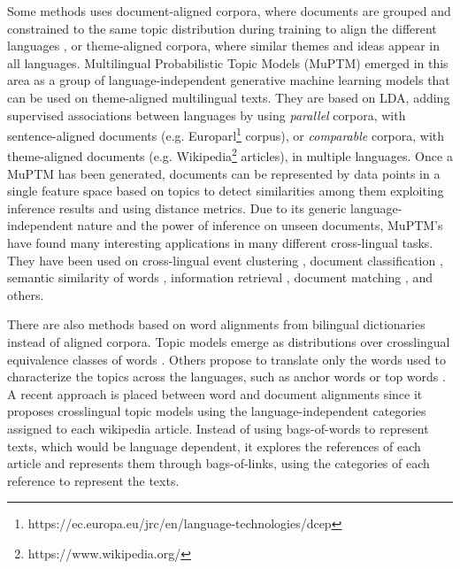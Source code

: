 Some methods uses document-aligned corpora, where documents are grouped and constrained to the same topic distribution during training to align the different languages \citep{Smet2009, mimno-etal-2009-polylingual, Ni2009, Fukumasu2012, Zhang2013}, or theme-aligned corpora, where similar themes and ideas appear in all languages\citep{Graber2009}. Multilingual Probabilistic Topic Models (MuPTM) \citep{Vulic2015} emerged in this area as a group of language-independent generative machine learning models that can be used on theme-aligned multilingual texts. They are based on LDA, adding supervised associations between languages by using \textit{parallel} corpora, with sentence-aligned documents (e.g. Europarl\footnote{https://ec.europa.eu/jrc/en/language-technologies/dcep} corpus), or \textit{comparable} corpora, with theme-aligned documents (e.g. Wikipedia\footnote{https://www.wikipedia.org/} articles), in multiple languages. Once a MuPTM has been generated, documents can be represented by data points in a single feature space based on topics to detect similarities among them exploiting inference results and using distance metrics. Due to its generic language-independent nature and the power of inference on unseen documents, MuPTM's have found many interesting applications in many different cross-lingual tasks. They have been used on cross-lingual event clustering \citep{DeSmet2009}, document classification \citep{10.1007/978-3-642-20841-6_45, Ni:2011:CLT:1935826.1935887},  semantic similarity of words \citep{Mimno:2009:PTM:1699571.1699627, Vulic:2012:DHC:2380816.2380872}, information retrieval \citep{10.1007/978-3-642-36973-5_9, ganguly-etal-2012-cross}, document matching \citep{Platt:2010:TDR:1870658.1870683, zhu-etal-2013-building}, and others. 

There are also methods based on word alignments from bilingual dictionaries instead of aligned corpora. Topic models emerge as distributions over crosslingual equivalence classes of words \citep{Jagarlamudi2010, zhang-etal-2010-cross, shi-etal-2016-detecting, hao-paul-2018-learning}. Others propose to translate only the words used to characterize the topics across the languages, such as anchor words \citep{NEURIPS2018_28b9f8aa} or top words \citep{yang2019multilingual}. A recent approach is placed between word and document alignments since it proposes crosslingual topic models using the language-independent categories assigned to each wikipedia article\citep{2020arXiv200911207P}. Instead of using bags-of-words to represent texts, which would be language dependent, it explores the references of each article and represents them through bags-of-links, using the categories of each reference to represent the texts.


